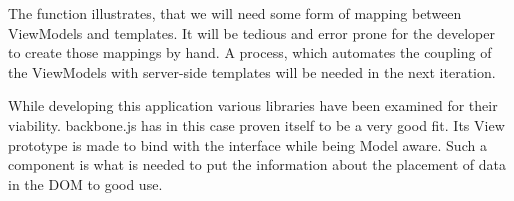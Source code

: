 The function  illustrates, that we will need some form
of mapping between ViewModels and templates.
It will be tedious and error prone for the developer to create those mappings
by hand. A process, which automates the coupling of the ViewModels with
server-side templates will be needed in the next iteration.

While developing this application various libraries have been examined for their
viability. backbone.js has in this case proven itself to be a very good fit.
Its View prototype is made to bind with the interface while being Model aware.
Such a component is what is needed to put the information about
the placement of data in the DOM to good use.
